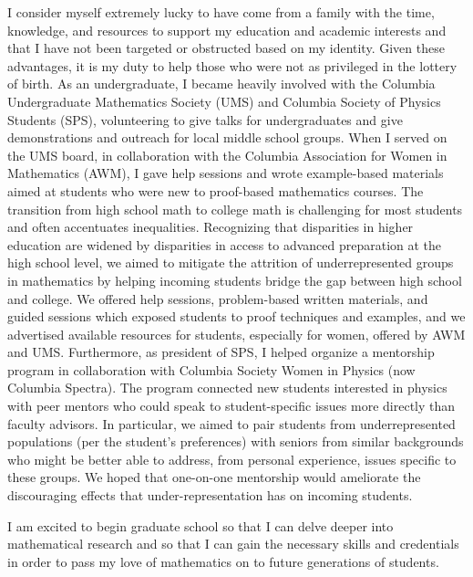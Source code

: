 \documentclass[11pt]{article}
\begin{document}
I consider myself extremely lucky to have come from a family with the time, knowledge, and resources to support my education and academic interests and that I have not been targeted or obstructed based on my identity. Given these advantages, it is my duty to help those who were not as privileged in the lottery of birth. As an undergraduate, I became heavily involved with the Columbia Undergraduate Mathematics Society (UMS) and Columbia Society of Physics Students (SPS), volunteering to give talks for undergraduates and give demonstrations and outreach for local middle school groups. When I served on the UMS board, in collaboration with the Columbia Association for Women in Mathematics (AWM), I gave help sessions and wrote example-based materials aimed at students who were new to proof-based mathematics courses. The transition from high school math to college math is challenging for most students and often accentuates inequalities. Recognizing that disparities in higher education are widened by disparities in access to advanced preparation at the high school level, we aimed to mitigate the attrition of underrepresented groups in mathematics by helping incoming students bridge the gap between high school and college. We offered help sessions, problem-based written materials, and guided sessions which exposed students to proof techniques and examples, and we advertised available resources for students, especially for women, offered by AWM and UMS. Furthermore, as president of SPS, I helped organize a mentorship program in collaboration with Columbia Society Women in Physics (now Columbia Spectra). The program connected new students interested in physics with peer mentors who could speak to student-specific issues more directly than faculty advisors. In particular, we aimed to pair students from underrepresented populations (per the student's preferences) with seniors from similar backgrounds who might be better able to address, from personal experience, issues specific to these groups. We hoped that one-on-one mentorship would ameliorate the discouraging effects that under-representation has on incoming students.
\par 
I am excited to begin graduate school so that I can delve deeper into mathematical research and so that I can gain the necessary skills and credentials in order to pass my love of mathematics on to future generations of students. 
\end{document}
